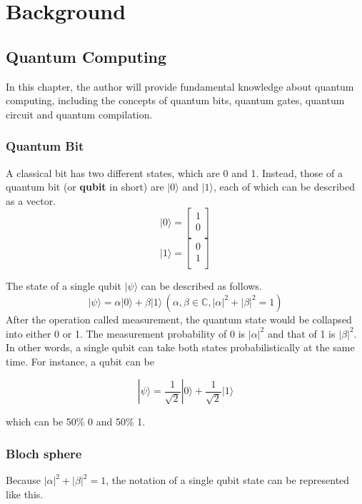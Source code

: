 \chapter{Background}
\label{theory_of_quantum_information}
\section{ Quantum Computing}

 In this chapter, the author will provide fundamental knowledge about quantum computing, including the concepts of quantum bits, quantum gates, quantum circuit and quantum compilation.

\subsection{Quantum Bit}

 A classical bit has two different states, which are 0 and 1.   Instead, those of a quantum bit (or \textbf{qubit} in short) are $|0\rangle$ and $|1\rangle$, each of which can be described as a vector.  
 $$|0\rangle = \left[
\begin{array}{c}
1 \\
0 \\
\end{array}
\right]$$
 $$|1\rangle = \left[
\begin{array}{c}
0 \\
1 \\
\end{array}
\right]$$

The state of a single 	qubit $|\psi\rangle$ can be described as follows.
$$ |\psi\rangle = \alpha |0\rangle + \beta |1\rangle \,(\alpha, \beta \in \mathbb{C}, |\alpha|^2+|\beta|^2=1)$$
 After the operation called measurement, the quantum state would be collapsed into either 0 or 1.  The measurement probability of 0 is $|\alpha|^2$ and that of 1 is $|\beta|^2$. In other words, a single qubit can take both states probabilistically at the same time.  For instance, a qubit can be 
 
\begin{equation}
	|\psi\rangle = \frac{1}{\sqrt{2}}|0\rangle + \frac{1}{\sqrt{2}}|1\rangle \tag{1}
\end{equation}

 which can be 50\% 0 and 50\% 1.
 
 \subsection{Bloch sphere}
 	Because $|\alpha|^2 + |\beta|^2 = 1$, the notation of a single qubit state can be represented like this.
	
